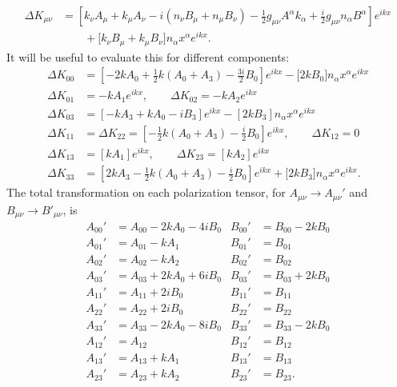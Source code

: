 \documentclass[10pt,letterpaper]{article}
\numberwithin{equation}{subsection}
\begin{document}
\begin{align}
\Delta K_{\mu\nu} &= \left[ k_\nu A_\mu + k_\mu A_\nu - i \left( n_\nu B_\mu + n_\mu B_\nu\right) 
-\frac12 g_{\mu\nu} A^\alpha k_\alpha + \frac{i}{2} g_{\mu\nu}n_\alpha B^\alpha \right]e^{ikx}
\nonumber\\
&\qquad + \bigg[ k_\nu B_\mu + k_\mu B_\nu \bigg] n_\alpha x^\alpha e^{ikx}.
\end{align}
It will be useful to evaluate this for different components:
\begin{align}
\Delta K_{00} &=\left[ -2 kA_0 +\frac12 k(A_0 + A_3) - \frac{3i}{2} B_0\right]e^{ikx} - \bigg[2kB_0\bigg] n_\alpha x^\alpha e^{ikx}
\nonumber\\
\Delta K_{01} &=  -k A_1 e^{ikx},\qquad \Delta K_{02} =  -k A_2 e^{ikx}
\nonumber\\
\Delta K_{03} &= \left[ -kA_3 +kA_0 -i B_3\right]e^{ikx} - \left[2kB_3\right] n_\alpha x^\alpha e^{ikx}
\nonumber\\
\Delta K_{11} &= \Delta K_{22} =  \left[ - \frac12 k(A_0 + A_3) - \frac{i}{2}B_0 \right]  e^{ikx},\qquad \Delta K_{12} = 0
\nonumber\\
\Delta K_{13} &= [kA_1]e^{ikx},\qquad \Delta K_{23} = [kA_2]e^{ikx}
\nonumber\\
\Delta K_{33} &= \left[ 2kA_3 -\frac12 k(A_0+A_3) - \frac{i}{2}B_0\right]e^{ikx} + \bigg[2kB_3\bigg]n_\alpha x^\alpha e^{ikx}.
\end{align}
The total transformation on each polarization tensor, for $A_{\mu\nu} \to A_{\mu\nu}'$ and $B_{\mu\nu} \to B'_{\mu\nu}$, is 
\begin{align}
A_{00}' &= A_{00} -2kA_0 - 4i B_0 			& B_{00}'&= B_{00} -2k B_0
\nonumber\\
A_{01}' &= A_{01} - kA_1							& B_{01}'&= B_{01} 
\nonumber\\
A_{02}' &= A_{02} - kA_2							&B_{02}'&= B_{02}
\nonumber\\
A_{03}' &= A_{03} +2kA_0 + 6i B_0			&B_{03}'&= B_{03} + 2kB_0
\nonumber \\
A_{11}' &= A_{11} + 2i B_0						&B_{11}'&= B_{11}
\nonumber\\
A_{22}' & = A_{22} +2iB_0						&B_{22}'&= B_{22}
\nonumber\\
A_{33}' &= A_{33}-2k A_0 - 8i B_0				&B_{33}'&= B_{33} - 2kB_0
\nonumber\\
A_{12}' &= A_{12}									&B_{12}'&=B_{12}
\nonumber\\
A_{13}' &= A_{13} + kA_1						&B_{13}'&=B_{13}
\nonumber\\
A_{23}' &= A_{23} + k A_2						&B_{23}'&=B_{23}.
\end{align}
\end{document}
